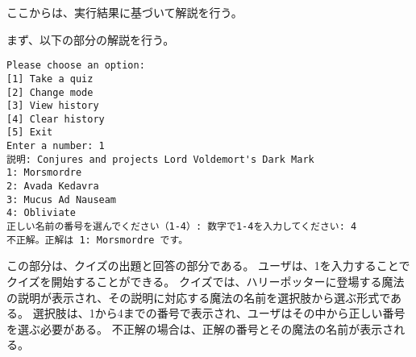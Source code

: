 \documentclass[uplatex,dvipdfmx,a4paper]{jsarticle}
\begin{document}
ここからは、実行結果に基づいて解説を行う。
\par まず、以下の部分の解説を行う。
\begin{lstlisting}[style=result]
  Please choose an option:
[1] Take a quiz
[2] Change mode
[3] View history
[4] Clear history
[5] Exit
Enter a number: 1
説明: Conjures and projects Lord Voldemort's Dark Mark
1: Morsmordre
2: Avada Kedavra
3: Mucus Ad Nauseam
4: Obliviate
正しい名前の番号を選んでください（1-4）: 数字で1-4を入力してください: 4
不正解。正解は 1: Morsmordre です。
\end{lstlisting}
この部分は、クイズの出題と回答の部分である。
ユーザは、1を入力することでクイズを開始することができる。
クイズでは、ハリーポッターに登場する魔法の説明が表示され、その説明に対応する魔法の名前を選択肢から選ぶ形式である。
選択肢は、1から4までの番号で表示され、ユーザはその中から正しい番号を選ぶ必要がある。
不正解の場合は、正解の番号とその魔法の名前が表示される。
\end{document}
